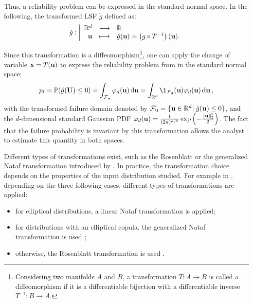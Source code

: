 Thus, a reliability problem can be expressed in the standard normal space. 
In the following, the transformed LSF $\check{g}$ defined as: 
\begin{equation}
    \check{g} : \bigg|
    \begin{array}{rcl}
        \mathbb{R}^d & \longrightarrow & \mathbb{R}\\
        {\bf u} & \longmapsto & \check{g}({\bf u}) = \left(g \circ T^{-1}\right)({\bf u}).
    \end{array}
\end{equation}

Since this transformation is a diffeomorphism\footnote{Considering two manifolds $A$ and $B$, a transformation $T: A \rightarrow B$ is called a diffeomorphism if it is a differentiable bijection with a differentiable inverse $T^{-1}: B \rightarrow A$.}, 
one can apply the change of variable ${\bf x} = T({\bf u})$ to express the reliability problem from  in the standard normal space: 
\begin{equation}
    \pf = \P(\cg(\bU) \leq 0) 
        = \int_{\iF_\bu} \varphi_d(\bu) \, \dd\bu 
        = \int_{\R^d} \1_{\iF_\bu}(\bu) \varphi_d(\bu) \, \dd\bu \,,
\end{equation}
with the transformed failure domain denoted by $\mathcal{F}_{\bf u} = \{{\bf u} \in \mathbb{R}^d \, | \, \check{g}({\bf u}) \leq 0\}$, 
and the $d$-dimensional standard Gaussian PDF $\varphi_d({\bf u}) = \frac{1}{(2\pi)^{d/2}} \exp\left(-\frac{\lVert{\bf u}\rVert^2_2}{2}\right)$. 
The fact that the failure probability is invariant by this transformation allows the analyst to estimate this quantity in both spaces.  

Different types of transformations exist, such as the Rosenblatt or the generalized Nataf transformation introduced by \citet{Lebrun_PHD_2013}. 
In practice, the transformation choice depends on the properties of the input distribution studied. 
For example in \ot, depending on the three following cases, different types of transformations are applied:
\begin{itemize}
    \item for elliptical distributions, a linear Nataf transformation is applied;
    \item for distributions with an elliptical copula, the generalized Nataf transformation is used \citep{lebrun_2009};
    \item otherwise, the Rosenblatt transformation is used \citep{lebrun_2009_dotheydiff}.
\end{itemize}  


